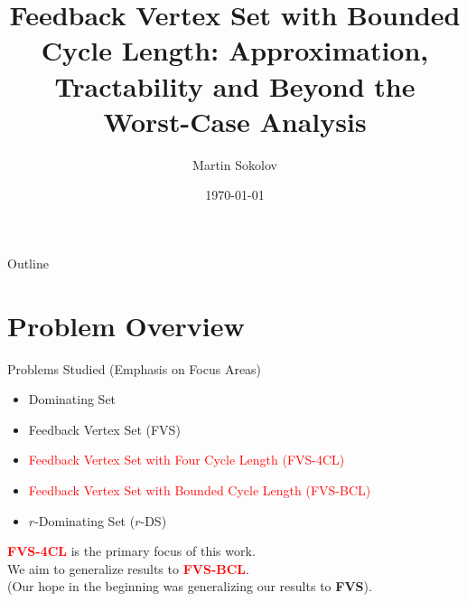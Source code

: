 \documentclass{beamer}
\title{Feedback Vertex Set with Bounded Cycle Length: Approximation, Tractability and Beyond the Worst-Case Analysis}
\author{Martin Sokolov}
\institute{Utrecht University}
\date{\today}
\begin{document}
\begin{frame}
  \titlepage
\end{frame}

\begin{frame}{Outline}
  \tableofcontents
\end{frame}

\section{Problem Overview}

\begin{frame}{Problems Studied (Emphasis on Focus Areas)}

\begin{itemize}
    \item Dominating Set
    \item \textcolor{red!50}{Feedback Vertex Set (FVS)}
    \item \textcolor{red}{Feedback Vertex Set with Four Cycle Length (FVS-4CL)}
    \item \textcolor{red}{Feedback Vertex Set with Bounded Cycle Length (FVS-BCL)}
    \item $r$-Dominating Set ($r$-DS)
\end{itemize}

\vspace{1em}
\small
\textcolor{red}{\textbf{FVS-4CL}} is the primary focus of this work.\\
We aim to generalize results to \textcolor{red}{\textbf{FVS-BCL}}.\\
(Our hope in the beginning was generalizing our results to \textcolor{red!50}{\textbf{FVS}}).
\end{frame}
\end{document}
